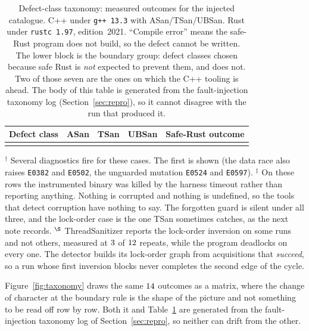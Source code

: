 \documentclass[english,oneside,a4paper,censored,csm,software-track-2020]{HYthesisML}
\begin{document}
\begin{table}[tp]
\centering
\small
\caption[Defect-class taxonomy: measured outcomes]{Defect-class taxonomy: measured outcomes for the injected catalogue. C++ under
\texttt{g++~13.3} with ASan/TSan/UBSan. Rust under \texttt{rustc~1.97}, edition~2021. ``Compile
error'' means the safe-Rust program does not build, so the defect cannot be written. The lower
block is the boundary group: defect classes chosen because safe Rust is \emph{not} expected to
prevent them, and does not. Two of those seven are the ones on which the C++ tooling is ahead.
The body of this table is generated from the fault-injection taxonomy log
(Section~\ref{sec:repro}), so it cannot
disagree with the run that produced it.\label{tab:taxonomy}}
\footnotesize
\setlength{\tabcolsep}{4pt}
\begin{tabular}{@{}l l l l l@{}}
\hline\hline
Defect class & ASan & TSan & UBSan & Safe-Rust outcome \\
\hline
\\
\hline
\end{tabular}

\vspace{0.4em}
{\footnotesize\raggedright
$^{\dagger}$ Several diagnostics fire for these cases. The first is shown (the data race also
raises \texttt{E0382} and \texttt{E0502}, the unguarded mutation \texttt{E0524} and
\texttt{E0597}). \quad
$^{\ddagger}$ On these rows the instrumented binary was killed by the harness timeout rather
than reporting anything. Nothing is corrupted and nothing is undefined, so the tools that
detect corruption have nothing to say. The forgotten guard is silent under all three, and the
lock-order case is the one TSan sometimes catches, as the next note records. \quad
$^{\S}$ ThreadSanitizer reports the lock-order inversion on some runs and not others, measured at
$3$ of $12$ repeats, while the program deadlocks on
every one. The detector builds its lock-order graph from acquisitions that \emph{succeed}, so a
run whose first inversion blocks never completes the second edge of the cycle.\par}
\end{table}

Figure~\ref{fig:taxonomy} draws the same $14$ outcomes as a matrix, where the change
of character at the boundary rule is the shape of the picture and not something to be read off
row by row. Both it and Table~\ref{tab:taxonomy} are generated from the fault-injection taxonomy
log of Section~\ref{sec:repro}, so neither can drift from the other.
\end{document}
